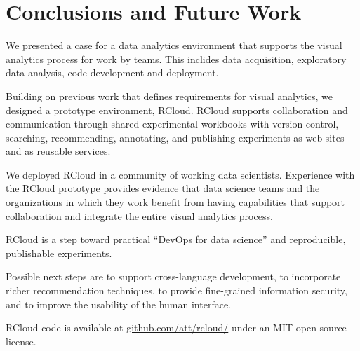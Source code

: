 \section{Conclusions and Future Work}

We presented a case for a data analytics environment that
supports the visual analytics process for work by teams.
This inclides data acquisition, exploratory data analysis,
code development and deployment.

Building on previous work that defines requirements for
visual analytics, we designed a prototype environment, RCloud.
RCloud supports collaboration and communication
through shared experimental workbooks with version
control, searching, recommending, annotating, and publishing
experiments as web sites and as reusable services. 

We deployed RCloud in a community of working data scientists.
Experience with the RCloud prototype provides evidence that data
science teams and the organizations in which they work benefit from
having capabilities that support collaboration and integrate
the entire visual analytics process.

RCloud is a step toward practical ``DevOps for data science'' and
reproducible, publishable experiments.

Possible next steps are to support cross-language development,
to incorporate richer recommendation techniques, to provide fine-grained
information security, and to improve the usability of the human interface.

RCloud code is available at \url{github.com/att/rcloud/}
under an MIT open source license.
